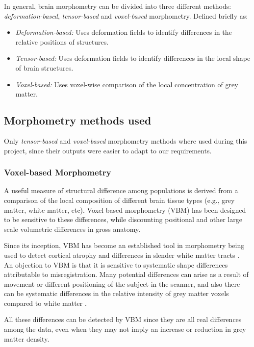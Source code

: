 In general, brain morphometry can be divided into three different methods: \textit{deformation-based}, \textit{tensor-based} and \textit{voxel-based} morphometry. Defined briefly as:
\begin{itemize}
\item \textit{Deformation-based:} Uses deformation fields to identify differences in the relative positions of structures.
\item \textit{Tensor-based:} Uses deformation fields to identify differences in the local shape of brain structures.
\item \textit{Voxel-based:} Uses voxel-wise comparison of the local concentration of grey matter.
\end{itemize}


\subsection{Morphometry methods used}
\label{sec:morph_methods}
Only \textit{tensor-based} and \textit{voxel-based} morphometry
methods where used during this project, since their outputs were
easier to adapt to our requirements.


\subsubsection{Voxel-based Morphometry}
A useful measure of structural difference among populations is derived
from a comparison of the local composition of different brain tissue
types (e.g., grey matter, white matter, etc). Voxel-based morphometry
(VBM) has been designed to be sensitive to these differences, while
discounting positional and other large scale volumetric differences in
gross anatomy.

Since its inception, VBM has become an established tool in morphometry
being used to detect cortical atrophy and differences in slender white
matter tracts \cite{ashburner}.\\

An objection to VBM is that it is sensitive to systematic shape
differences attributable to misregistration. Many potential
differences can arise as a result of movement or different positioning
of the subject in the scanner, and also there can be systematic
differences in the relative intensity of grey matter voxels compared
to white matter \cite{ashburner}.

All these differences can be detected by VBM since they are all real
differences among the data, even when they may not imply an increase
or reduction in grey matter density.\\

